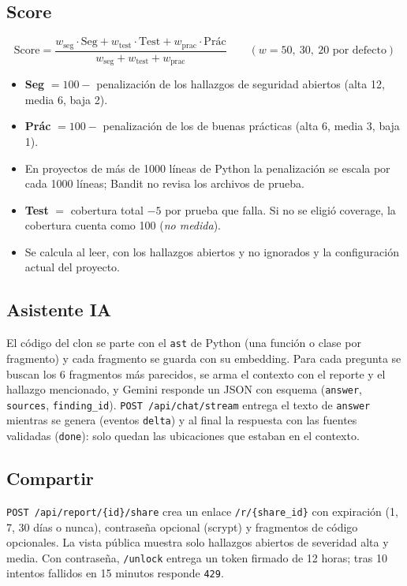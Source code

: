 \documentclass[11pt,a4paper]{article}
\newcommand{\code}[1]{\texttt{\small #1}}
\newcommand{\ruta}[1]{\texttt{\small\color{branddark}#1}}
\begin{document}
\subsection{Score}

\[
\text{Score} = \frac{w_{\text{seg}}\cdot\text{Seg} + w_{\text{test}}\cdot\text{Test} + w_{\text{prac}}\cdot\text{Prác}}{w_{\text{seg}} + w_{\text{test}} + w_{\text{prac}}}
\qquad (w = 50,\ 30,\ 20 \text{ por defecto})
\]

\begin{itemize}
  \item \textcolor{seg}{\textbf{Seg}} $= 100 -$ penalización de los hallazgos de seguridad abiertos (alta 12, media 6, baja 2).
  \item \textcolor{prac}{\textbf{Prác}} $= 100 -$ penalización de los de buenas prácticas (alta 6, media 3, baja 1).
  \item En proyectos de más de 1000 líneas de Python la penalización se escala por cada 1000 líneas; Bandit no
        revisa los archivos de prueba.
  \item \textcolor{test}{\textbf{Test}} $=$ cobertura total $- 5$ por prueba que falla. Si no se eligió coverage, la
        cobertura cuenta como 100 (\emph{no medida}).
  \item Se calcula al leer, con los hallazgos abiertos y no ignorados y la configuración actual del proyecto.
\end{itemize}

\subsection{Asistente IA}

El código del clon se parte con el \code{ast} de Python (una función o clase por fragmento) y cada fragmento se guarda
con su embedding. Para cada pregunta se buscan los 6 fragmentos más parecidos, se arma el contexto con el reporte y el
hallazgo mencionado, y Gemini responde un JSON con esquema (\code{answer}, \code{sources}, \code{finding\_id}).
\code{POST /api/chat/stream} entrega el texto de \code{answer} mientras se genera (eventos \code{delta}) y al final la
respuesta con las fuentes validadas (\code{done}): solo quedan las ubicaciones que estaban en el contexto.

\subsection{Compartir}

\code{POST /api/report/\{id\}/share} crea un enlace \ruta{/r/\{share\_id\}} con expiración (1, 7, 30 días o nunca),
contraseña opcional (scrypt) y fragmentos de código opcionales. La vista pública muestra solo hallazgos abiertos de
severidad alta y media. Con contraseña, \code{/unlock} entrega un token firmado de 12 horas; tras 10 intentos fallidos
en 15 minutos responde \code{429}.
\end{document}
